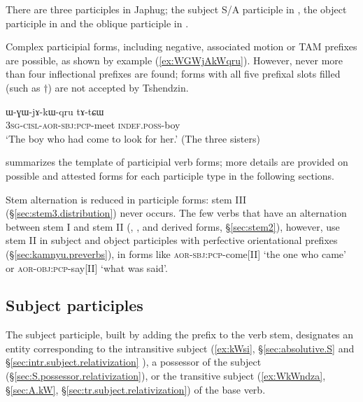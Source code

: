 There are three participles in Japhug; the subject S/A participle in , the object participle in  and the oblique participle in . 

Complex participial forms, including negative, associated motion or TAM prefixes are possible, as shown by example (\ref{ex:WGWjAkWqru}). However, never more than four inflectional prefixes are found; forms with all five prefixal slots filled (such as $\dagger$) are not accepted by Tshendzin.

 \begin{exe}
\ex \label{ex:WGWjAkWqru}
\gll ɯ-ɣɯ-jɤ-kɯ-qru tɤ-tɕɯ  \\
  \textsc{3sg}-\textsc{cisl}-\textsc{aor}-\textsc{sbj}:\textsc{pcp}-meet \textsc{indef}.\textsc{poss}-boy   \\
\glt `The boy who had come to look for her.' (The three sisters)
 \end{exe}

 summarizes the template of participial verb forms; more details are provided on possible and attested forms for each participle type in the following sections.

\begin{table}[h]
\caption{The template of participial verb forms in Japhug} \centering \label{tab:template.nmlz}
\end{table}

Stem alternation is reduced in participle forms: stem III (§\ref{sec:stem3.distribution}) never occurs. The few verbs that have an alternation between stem I and stem II (, ,  and derived forms, §\ref{sec:stem2}), however, use stem II in subject and object participles with perfective orientational prefixes (§\ref{sec:kamnyu.preverbs}), in forms like  \textsc{aor}-\textsc{sbj}:\textsc{pcp}-come[II] `the one who came'
or  \textsc{aor}-\textsc{obj}:\textsc{pcp}-say[II] `what was said'.
 
\subsection{Subject participles} \label{sec:subject.participles}
The subject participle, built by adding the prefix  to the verb stem, designates an entity corresponding to the intransitive subject (\ref{ex:kWsi}, §\ref{sec:absolutive.S} and §\ref{sec:intr.subject.relativization} ), a possessor of the subject (§\ref{sec:S.possessor.relativization}), or the transitive subject (\ref{ex:WkWndza}, §\ref{sec:A.kW}, §\ref{sec:tr.subject.relativization}) of the base verb. 

